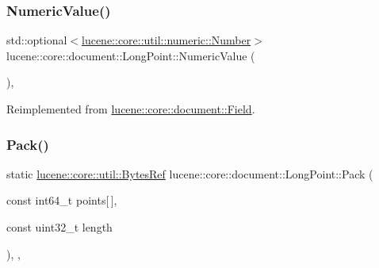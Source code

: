 \subsubsection{\texorpdfstring{Numeric\+Value()}{NumericValue()}}
{\footnotesize\ttfamily std\+::optional$<$\mbox{\hyperlink{classlucene_1_1core_1_1util_1_1numeric_1_1Number}{lucene\+::core\+::util\+::numeric\+::\+Number}}$>$ lucene\+::core\+::document\+::\+Long\+Point\+::\+Numeric\+Value (\begin{DoxyParamCaption}{ }\end{DoxyParamCaption})\hspace{0.3cm}{\ttfamily [inline]}, {\ttfamily [virtual]}}



Reimplemented from \mbox{\hyperlink{classlucene_1_1core_1_1document_1_1Field_a858814043215c98bacf6ecc823d078ea}{lucene\+::core\+::document\+::\+Field}}.

\mbox{\label{classlucene_1_1core_1_1document_1_1LongPoint_ae106b6585f35417b63c6f1f3aaeb1b93}} 
\subsubsection{\texorpdfstring{Pack()}{Pack()}}
{\footnotesize\ttfamily static \mbox{\hyperlink{classlucene_1_1core_1_1util_1_1BytesRef}{lucene\+::core\+::util\+::\+Bytes\+Ref}} lucene\+::core\+::document\+::\+Long\+Point\+::\+Pack (\begin{DoxyParamCaption}\item[{const int64\+\_\+t}]{points\mbox{[}$\,$\mbox{]},  }\item[{const uint32\+\_\+t}]{length }\end{DoxyParamCaption})\hspace{0.3cm}{\ttfamily [inline]}, {\ttfamily [static]}, {\ttfamily [private]}}

\mbox{\label{classlucene_1_1core_1_1document_1_1LongPoint_a3ba17f0b827e583a9b568e368dd798ac}} 
